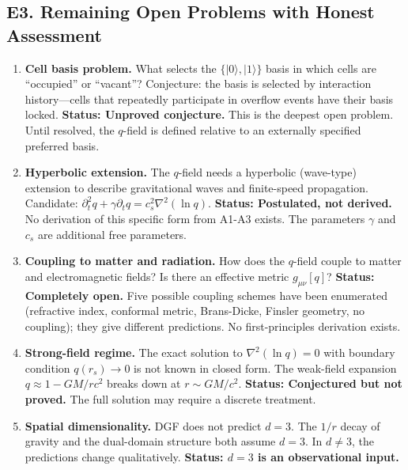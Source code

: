 \documentclass[reprint]{revtex4-2}
\begin{document}
\subsection{E3. Remaining Open Problems with Honest Assessment}

\begin{enumerate}[leftmargin=*, label=\textbf{OP-\arabic*:}]

\item \textbf{Cell basis problem.} What selects the $\{|0\rangle,|1\rangle\}$ basis in which cells are ``occupied'' or ``vacant''? Conjecture: the basis is selected by interaction history---cells that repeatedly participate in overflow events have their basis locked. \textbf{Status: Unproved conjecture.} This is the deepest open problem. Until resolved, the $q$-field is defined relative to an externally specified preferred basis.

\item \textbf{Hyperbolic extension.} The $q$-field needs a hyperbolic (wave-type) extension to describe gravitational waves and finite-speed propagation. Candidate: $\partial_t^2 q + \gamma\partial_t q = c_s^2\nabla^2(\ln q)$. \textbf{Status: Postulated, not derived.} No derivation of this specific form from A1-A3 exists. The parameters $\gamma$ and $c_s$ are additional free parameters.

\item \textbf{Coupling to matter and radiation.} How does the $q$-field couple to matter and electromagnetic fields? Is there an effective metric $g_{\mu\nu}[q]$? \textbf{Status: Completely open.} Five possible coupling schemes have been enumerated (refractive index, conformal metric, Brans-Dicke, Finsler geometry, no coupling); they give different predictions. No first-principles derivation exists.

\item \textbf{Strong-field regime.} The exact solution to $\nabla^2(\ln q)=0$ with boundary condition $q(r_s)\to0$ is not known in closed form. The weak-field expansion $q\approx 1-GM/rc^2$ breaks down at $r\sim GM/c^2$. \textbf{Status: Conjectured but not proved.} The full solution may require a discrete treatment.

\item \textbf{Spatial dimensionality.} DGF does not predict $d=3$. The $1/r$ decay of gravity and the dual-domain structure both assume $d=3$. In $d\neq 3$, the predictions change qualitatively. \textbf{Status: $d=3$ is an observational input.}


\end{enumerate}
\end{document}
